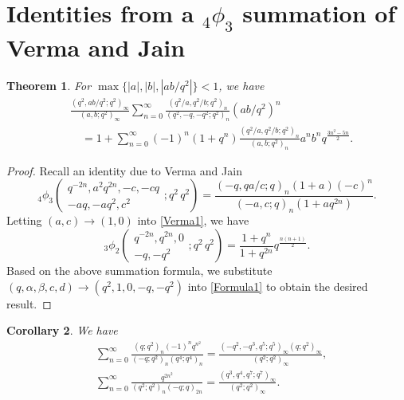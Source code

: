 \documentclass[reqno,12pt]{amsart}
\newtheorem{theorem}{Theorem}[section]%
\newtheorem{corollary}[theorem]{Corollary}
\theoremstyle{remark}
\numberwithin{equation}{section}
\begin{document}
\section{Identities from a $_4\phi_3$ summation of Verma and Jain}
%
\begin{theorem}\label{T3}
For $\max\{|a|, |b|, |ab/q^2|\}<1$, we have
\begin{align*}
&\frac{\left(q^2,ab/q^2;q^2\right)_{\infty}}{\left(a,b;q^2\right)_{\infty}}
\sum_{n=0}^{\infty}\frac{\left(q^2/a,q^2/b;q^2\right)_n}
{\left(q^2,-q,-q^2;q^2\right)_n}\left(ab/q^2\right)^n\\
&\quad=1+\sum_{n=0}^{\infty}\left(-1\right)^n\left(1+q^n\right)
\frac{\left(q^2/a,q^2/b;q^2\right)_n}
{\left(a,b;q^2\right)_n}a^nb^nq^{\frac{3n^2-5n}{2}}.
\end{align*}
\end{theorem}
\begin{proof}
Recall an identity due to Verma and Jain \cite[Eq. (5.4)]{Verma}
\begin{equation}\label{Verma1}
_4\phi_3\left(\begin{array}{cccc}
q^{-2n},a^2q^{2n},-c, -cq\\
-aq,-aq^2,c^2
\end{array};q^2\,q^2\right)
=\frac{\left(-q,qa/c;q\right)_n\left(1+a\right)\left(-c\right)^n}
{\left(-a,c;q\right)_n\left(1+aq^{2n}\right)}.
\end{equation}
Letting $\left(a,c\right)\to\left(1,0\right)$ into \eqref{Verma1}, we have
\begin{equation*}
_3\phi_2\left(\begin{array}{ccc}
q^{-2n},q^{2n},0\\
-q,-q^2
\end{array};q^2\,q^2\right)=\frac{1+q^n}{1+q^{2n}}
q^{\frac{n\left(n+1\right)}{2}}.
\end{equation*}
Based on the above summation formula, we substitute $\left(q,\alpha,\beta,c,d\right)\to\left(q^2,1,0,-q,-q^2\right)$ into \eqref{Formula1} to obtain the desired result.
\end{proof}
\begin{corollary}
We have
\begin{align}
&\sum_{n=0}^{\infty}
\frac{\left(q;q^2\right)_n\left(-1\right)^nq^{n^2}}
{\left(-q;q^2\right)_n\left(q^4;q^4\right)_n}
=\frac{\left(-q^2,-q^3,q^5;q^5\right)_{\infty}
\left(q;q^2\right)_{\infty}}{\left(q^2;q^2\right)_{\infty}}, \tag{S.21}\label{S.21}\\
&\sum_{n=0}^{\infty}
\frac{q^{2n^2}}
{\left(q^2;q^2\right)_n\left(-q;q\right)_{2n}}
=\frac{\left(q^3,q^4,q^7;q^7\right)_{\infty}}
{\left(q^2;q^2\right)_{\infty}}.\tag{S.33}\label{S.33}
\end{align}
\end{corollary}
\end{document}
